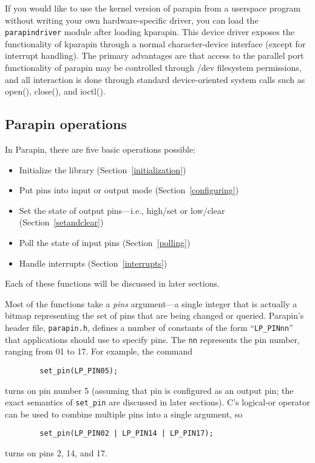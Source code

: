 \documentclass{article}
\begin{document}
If you would like to use the kernel version of parapin
from a userspace program without writing your own hardware-specific driver,
you can load the {\tt parapindriver} module
after loading kparapin.  This device driver exposes
the functionality of kparapin through a normal character-device interface
(except for interrupt handling).
The primary advantages are that
access to the parallel port functionality of parapin may be controlled
through /dev filesystem permissions, and all interaction is done through
standard device-oriented system calls such as open(), close(), and
ioctl().

\subsection{Parapin operations}

In Parapin, there are five basic operations possible:

\begin{itemize}
\item Initialize the library (Section~\ref{initialization})
\item Put pins into input or output mode (Section~\ref{configuring})
\item Set the state of output pins---i.e., high/set or low/clear
(Section~\ref{setandclear})
\item Poll the state of input pins (Section~\ref{polling})
\item Handle interrupts (Section~\ref{interrupts})
\end{itemize}

Each of these functions will be discussed in later sections.

Most of the functions take a {\em pins} argument---a single integer
that is actually a bitmap representing the set of pins that are being
changed or queried.  Parapin's header file, {\tt parapin.h}, defines a
number of constants of the form ``{\tt LP\_PINnn}'' that applications
should use to specify pins.  The {\tt nn} represents the pin number,
ranging from 01 to 17.  For example, the command
\begin{verbatim}
        set_pin(LP_PIN05);
\end{verbatim}
turns on pin number 5 (assuming that pin is configured as an output
pin; the exact semantics of {\tt set\_pin} are discussed in later
sections).  C's logical-or operator can be used to combine
multiple pins into a single argument, so
\begin{verbatim}
        set_pin(LP_PIN02 | LP_PIN14 | LP_PIN17);
\end{verbatim}
turns on pins 2, 14, and 17.
\end{document}
